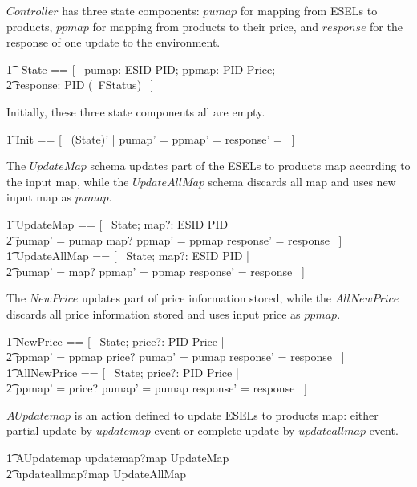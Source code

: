 $Controller$ has three state components: $pumap$ for mapping from ESELs to products, $ppmap$ for mapping from products to their price, and $response$ for the response of one update to the environment.
\begin{circusaction}
    	\t1 \circstate\ State == [~ pumap: ESID \pfun PID; ppmap: PID \pfun Price; \\
            \t2 response: PID \pfun (\power~FStatus) ~]
\end{circusaction}
Initially, these three state components all are empty.
\begin{zed}
    	\t1	Init == [~ (State)' | pumap' = \emptyset \land ppmap' = \emptyset \land response' = \emptyset ~]
\end{zed}
The $UpdateMap$ schema updates part of the ESELs to products map according to the input map, while the $UpdateAllMap$ schema discards all map and uses new input map as $pumap$. 
\begin{zed}
        \t1 UpdateMap == [~ \Delta State; map?: ESID \pfun PID | \\
            \t2 pumap' = pumap \oplus map? \land ppmap' = ppmap \land response' = response ~] \\
        \t1 UpdateAllMap == [~ \Delta State; map?: ESID \pfun PID | \\
            \t2 pumap' = map? \land ppmap' = ppmap \land response' = response ~] 
\end{zed}
The $NewPrice$ updates part of price information stored, while the $AllNewPrice$ discards all price information stored and uses input price as $ppmap$. 
\begin{zed}
        \t1 NewPrice == [~ \Delta State; price?: PID \pfun Price | \\
            \t2 ppmap' = ppmap \oplus price? \land pumap' = pumap \land response' = response ~] \\
        \t1 AllNewPrice == [~ \Delta State; price?: PID \pfun Price | \\
            \t2 ppmap' = price? \land pumap' = pumap \land response' = response ~]
\end{zed}
$AUpdatemap$ is an action defined to update ESELs to products map: either partial update by $updatemap$ event or complete update by $updateallmap$ event.
\begin{circusaction}
        \t1 AUpdatemap \circdef updatemap?map \then \lschexpract UpdateMap \rschexpract \\
            \t2 \extchoice updateallmap?map \then \lschexpract UpdateAllMap \rschexpract \\
\end{circusaction}
